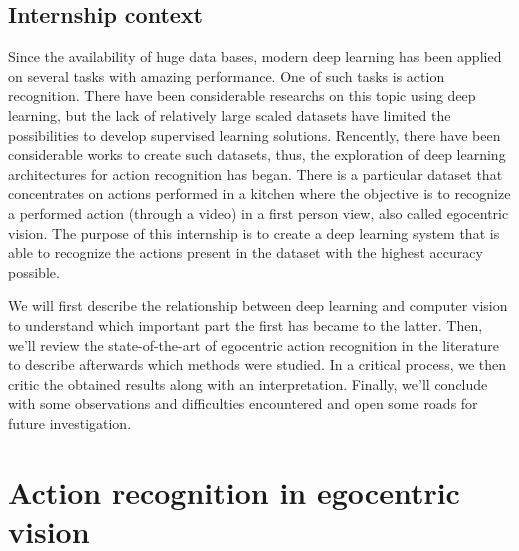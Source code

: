 \documentclass[12pt, a4paper]{report}
\begin{document}
		\section{Internship context}
			Since the availability of huge data bases, modern deep learning has been applied on several tasks with amazing performance.
			One of such tasks is action recognition.
			There have been considerable researchs on this topic using deep learning, but the lack of relatively large scaled datasets have limited the possibilities to develop supervised learning solutions.
			Rencently, there have been considerable works to create such datasets, thus, the exploration of deep learning architectures for action recognition has began.
			There is a particular dataset that concentrates on actions performed in a kitchen where the objective is to recognize a performed action (through a video) in a first person view, also called egocentric vision.
			The purpose of this internship is to create a deep learning system that is able to recognize the actions present in the dataset with the highest accuracy possible.\par
			\bigbreak
			We will first describe the relationship between deep learning and computer vision to understand which important part the first has became to the latter.
			Then, we'll review the state-of-the-art of egocentric action recognition in the literature to describe afterwards which methods were studied.
			In a critical process, we then critic the obtained results along with an interpretation.
			Finally, we'll conclude with some observations and difficulties encountered and open some roads for future investigation.

	\chapter{Action recognition in egocentric vision}
\end{document}
